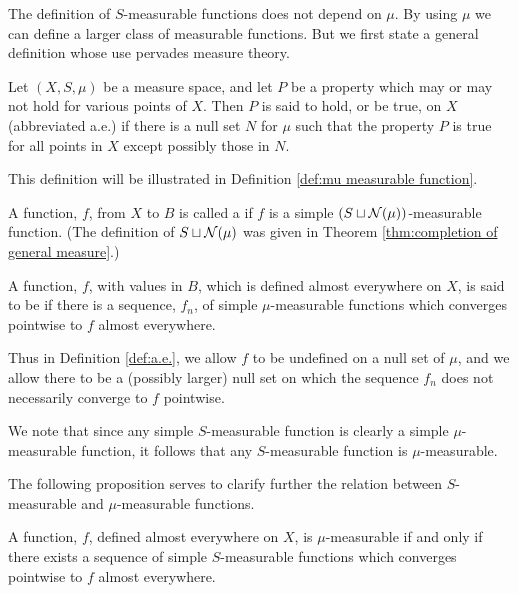 The definition of $S$-measurable functions does not depend on $\mu$. By using $\mu$ we can define a larger class of measurable functions. But we first state a general definition whose use pervades measure theory.

\begin{definition}
\label{def:a.e.}
Let $(X,S,\mu)$ be a measure space, and let $P$ be a property which may or may not hold for various points of $X$. Then $P$ is said to hold, or be true,  on $X$ (abbreviated a.e.) if there is a null set $N$ for $\mu$ such that the property $P$ is true for all points in $X$ except possibly those in $N$.
\end{definition}

This definition will be illustrated in Definition \ref{def:mu measurable function}.

\begin{definition}
A function, $f$, from $X$ to $B$ is called a  if $f$ is a simple $(S\sqcup{\cal N}(\mu))$-measurable function. (The definition of $S\sqcup{\cal N}(\mu)$ was given in Theorem \ref{thm:completion of general measure}.)
\end{definition}

\begin{definition}
\label{def:mu measurable function}
A function, $f$, with values in $B$, which is defined almost everywhere on $X$, is said to be  if there is a sequence, $f_n$, of simple $\mu$-measurable functions which converges pointwise to $f$ almost everywhere.
\end{definition}

Thus in Definition \ref{def:a.e.}, we allow $f$ to be undefined on a null set of $\mu$, and we allow there to be a (possibly larger) null set on which the sequence $f_n$ does not necessarily converge to $f$ pointwise.

We note that since any simple $S$-measurable function is clearly a simple $\mu$-measurable function, it follows that any $S$-measurable function is $\mu$-measurable.

The following proposition serves to clarify further the relation between $S$-measurable and $\mu$-measurable functions.

\begin{proposition}
A function, $f$, defined almost everywhere on $X$, is $\mu$-measurable if and only if there exists a sequence of simple $S$-measurable functions which converges pointwise to $f$ almost everywhere.
\end{proposition}

